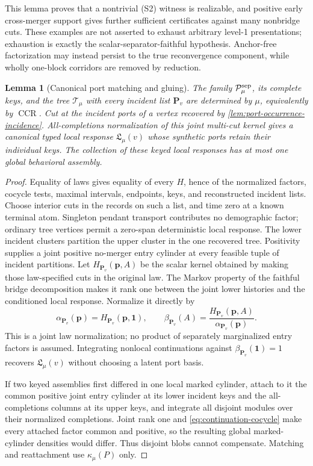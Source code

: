 \documentclass[11pt]{article}
\newtheorem{lemma}[theorem]{Lemma}
\newcommand{\CCR}{\operatorname{CCR}}
\newcommand{\one}{\mathbf 1}
\newcommand{\cP}{\mathcal P}
\begin{document}
This lemma proves that a nontrivial (S2) witness is realizable, and positive early cross-merger support gives further sufficient certificates against many nonbridge cuts.  These examples are not asserted to exhaust arbitrary level-1 presentations; exhaustion is exactly the scalar-separator-faithful hypothesis.  Anchor-free factorization may instead persist to the true reconvergence component, while wholly one-block corridors are removed by reduction.

\begin{lemma}[Canonical port matching and gluing]
\label{lem:canonical-port-gluing}
The family $\cP_\mu^{\rm sep}$, its complete keys, and the tree $\mathcal T_\mu$ with every incident list $\mathbf P_v$ are determined by $\mu$, equivalently by $\CCR$.  Cut at the incident ports of a vertex recovered by \cref{lem:port-occurrence-incidence}.  All-completions normalization of this joint multi-cut kernel gives a canonical typed local response $\mathfrak L_\mu(v)$ whose synthetic ports retain their individual keys.  The collection of these keyed local responses has at most one global behavioral assembly.
\end{lemma}

\begin{proof}
Equality of laws gives equality of every $H$, hence of the normalized factors, cocycle tests, maximal intervals, endpoints, keys, and reconstructed incident lists.  Choose interior cuts in the records on such a list, and time zero at a known terminal atom.  Singleton pendant transport contributes no demographic factor; ordinary tree vertices permit a zero-span deterministic local response.  The lower incident clusters partition the upper cluster in the one recovered tree.  Positivity supplies a joint positive no-merger entry cylinder at every feasible tuple of incident partitions.  Let $H_{\mathbf P_v}(\mathbf p,A)$ be the scalar kernel obtained by making those law-specified cuts in the original law.  The Markov property of the faithful bridge decomposition makes it rank one between the joint lower histories and the conditioned local response.  Normalize it directly by
\[
\alpha_{\mathbf P_v}(\mathbf p)
=H_{\mathbf P_v}(\mathbf p,\one),
\qquad
\beta_{\mathbf P_v}(A)
=\frac{H_{\mathbf P_v}(\mathbf p,A)}
       {\alpha_{\mathbf P_v}(\mathbf p)}.
\]
This is a joint law normalization; no product of separately marginalized entry factors is assumed.  Integrating nonlocal continuations against $\beta_{\mathbf P_v}(\one)=1$ recovers $\mathfrak L_\mu(v)$ without choosing a latent port basis.

If two keyed assemblies first differed in one local marked cylinder, attach to it the common positive joint entry cylinder at its lower incident keys and the all-completions columns at its upper keys, and integrate all disjoint modules over their normalized completions.  Joint rank one and \eqref{eq:continuation-cocycle} make every attached factor common and positive, so the resulting global marked-cylinder densities would differ.  Thus disjoint blobs cannot compensate.  Matching and reattachment use $\kappa_\mu(P)$ only.
\end{proof}
\end{document}
